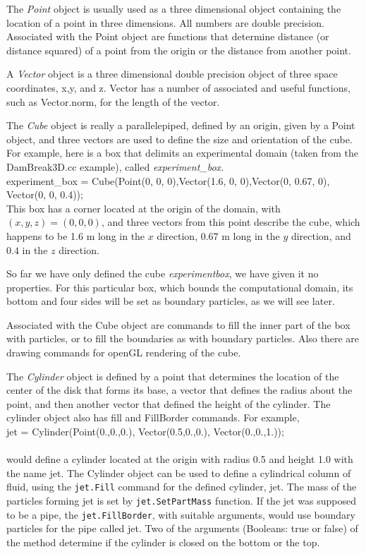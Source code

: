 \documentclass[12pt]{memoir}
\begin{document}
The {\em Point} object is usually used as a three dimensional object
containing the location of a point in three dimensions. All numbers are
double precision. Associated with the Point object are functions that
determine distance (or distance squared) of a point from the origin or
the distance from another point.

A {\em Vector} object is a three dimensional double precision object of
three space coordinates, x,y, and z. Vector has a number of associated
and useful functions, such as Vector.norm, for the length of the vector.


The {\em Cube} object is really a parallelepiped, defined by an origin,
given by a Point object, and three vectors are used to define the size
and orientation of the cube. For example, here is a box that delimits
an experimental domain (taken from the DamBreak3D.cc example), called
{\em experiment\_box.} \\

\noindent experiment\_box = Cube(Point(0, 0, 0),Vector(1.6, 0,
0),Vector(0, 0.67, 0), Vector(0, 0, 0.4));\\

This box has a corner located at the origin of the domain, with $(x, y,
z) = (0,0,0)$, and three vectors from this point describe the cube,
which happens to be 1.6 m long in the $x$ direction, 0.67 m long in the
$y$ direction, and $0.4$ in the $z$ direction.

So far we have only defined the cube {\em experiment\-box}, we have
given it no properties. For this particular box, which bounds the
computational domain, its bottom and four sides will be set as boundary
particles, as we will see later.

Associated with the Cube object are commands to fill the inner part of
the box with particles, or to fill the boundaries as with boundary
particles. Also there are drawing commands for openGL rendering of the
cube.


The {\em Cylinder} object is defined by a point that determines the
location of the center of the disk that forms its base, a vector that
defines the radius about the point, and then another vector that defined
the height of the cylinder. The cylinder object also has fill and
FillBorder commands. For example, \\

jet = Cylinder(Point(0.,0.,0.), Vector(0.5,0.,0.), Vector(0.,0.,1.));\\
\\would define a cylinder located at the origin with radius 0.5 and
height 1.0 with the name jet. The Cylinder object can be used to
define a cylindrical column of fluid, using the \verb!jet.Fill!
command for the defined cylinder, jet. The mass of the particles
forming jet is set by \verb!jet.SetPartMass! function. If the jet was
supposed to be a pipe, the \verb!jet.FillBorder!, with suitable
arguments, would use boundary particles for the pipe called jet. Two
of the arguments (Booleans: true or false) of the method determine if
the cylinder is closed on the bottom or the top.
\end{document}
